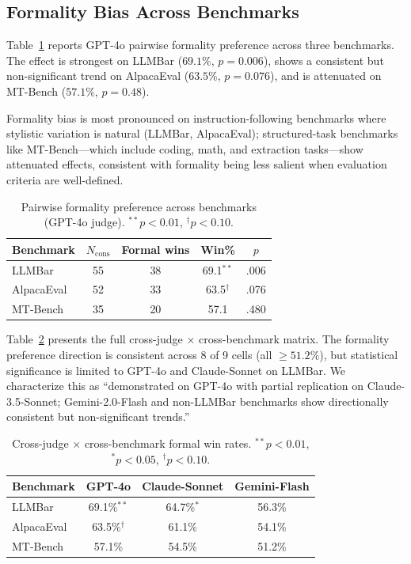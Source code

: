 \documentclass[11pt,a4paper]{article}
\begin{document}
\subsection{Formality Bias Across Benchmarks}
\label{sec:multi_bench}

Table~\ref{tab:multi_bench} reports GPT-4o pairwise formality preference across three benchmarks.
The effect is strongest on LLMBar ($69.1\%$, $p=0.006$), shows a consistent but non-significant trend on AlpacaEval ($63.5\%$, $p=0.076$), and is attenuated on MT-Bench ($57.1\%$, $p=0.48$).

Formality bias is most pronounced on instruction-following benchmarks where stylistic variation is natural (LLMBar, AlpacaEval); structured-task benchmarks like MT-Bench---which include coding, math, and extraction tasks---show attenuated effects, consistent with formality being less salient when evaluation criteria are well-defined.

\begin{table}[t]
\centering
\small
\caption{Pairwise formality preference across benchmarks (GPT-4o judge). $^{**}p<0.01$, $^{\dagger}p<0.10$.}
\label{tab:multi_bench}
\begin{tabular}{lcccc}
\toprule
\textbf{Benchmark} & \textbf{$N_{\text{cons}}$} & \textbf{Formal wins} & \textbf{Win\%} & \textbf{$p$} \\
\midrule
LLMBar & 55 & 38 & 69.1$^{**}$ & .006 \\
AlpacaEval & 52 & 33 & 63.5$^{\dagger}$ & .076 \\
MT-Bench & 35 & 20 & 57.1 & .480 \\
\bottomrule
\end{tabular}
\end{table}

Table~\ref{tab:cross_judge_bench} presents the full cross-judge $\times$ cross-benchmark matrix.
The formality preference direction is consistent across 8 of 9 cells (all $\geq 51.2\%$), but statistical significance is limited to GPT-4o and Claude-Sonnet on LLMBar.
We characterize this as ``demonstrated on GPT-4o with partial replication on Claude-3.5-Sonnet; Gemini-2.0-Flash and non-LLMBar benchmarks show directionally consistent but non-significant trends.''

\begin{table}[t]
\centering
\small
\caption{Cross-judge $\times$ cross-benchmark formal win rates. $^{**}p<0.01$, $^{*}p<0.05$, $^{\dagger}p<0.10$.}
\label{tab:cross_judge_bench}
\begin{tabular}{lccc}
\toprule
\textbf{Benchmark} & \textbf{GPT-4o} & \textbf{Claude-Sonnet} & \textbf{Gemini-Flash} \\
\midrule
LLMBar & 69.1\%$^{**}$ & 64.7\%$^{*}$ & 56.3\% \\
AlpacaEval & 63.5\%$^{\dagger}$ & 61.1\% & 54.1\% \\
MT-Bench & 57.1\% & 54.5\% & 51.2\% \\
\bottomrule
\end{tabular}
\end{table}
\end{document}
